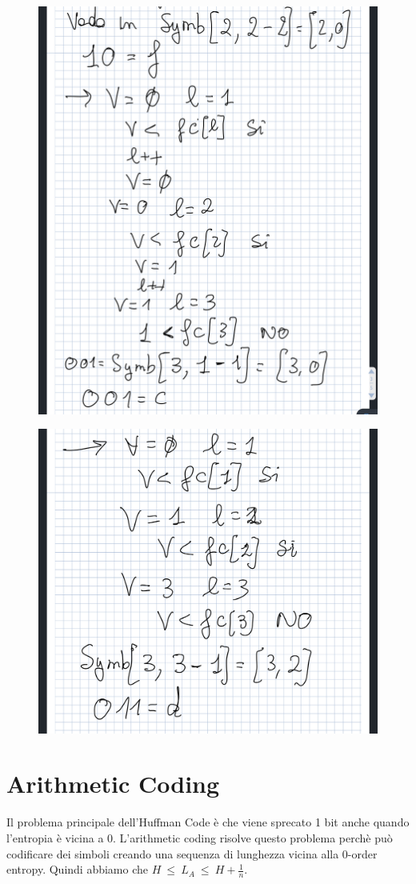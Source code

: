 \documentclass[14pt]{extreport}
\begin{document}
\begin{figure}[H]
\centering
  \includegraphics[width=0.7\linewidth]{IMG_0173.jpg}

\end{figure}
\begin{figure}[H]
\centering
  \includegraphics[width=0.7\linewidth]{IMG_0174.jpg}

\end{figure}


\section{Arithmetic Coding}

Il problema principale dell'Huffman Code è che viene sprecato 1 bit anche quando l'entropia è vicina a 0. L'arithmetic coding risolve questo problema perchè può codificare dei simboli creando una sequenza di lunghezza vicina alla 0-order entropy.
Quindi abbiamo che $H \ \leq \ L_A \ \leq \ H + \frac{1}{n}$.
\end{document}
